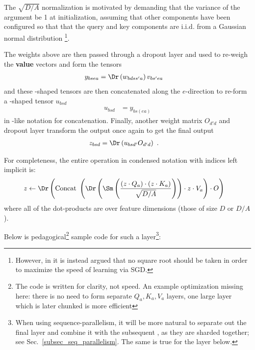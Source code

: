 The $ \sqrt{D/A} $ normalization is motivated by demanding
that the variance of the  argument be 1 at initialization, assuming that other
components have been configured so that that the query and key components are i.i.d. from a Gaussian
normal distribution \footnote{However, in \cite{yang2022tensor} it is instead argued that no square
	root should be taken in order to maximize the speed of learning via SGD.}.

The weights above are then passed through a dropout layer and used to re-weigh the \textbf{value} vectors and form the tensors
\begin{align}
	y _{ bse a} & =\Dr  \left (w _{ bdss' a} \right ) v _{ bs'ea }
	\label{eq_reweighted_values}
\end{align}
and these -shaped tensors
are then concatenated along the $ e $-direction to re-form a -shaped
tensor $ u _{ bsd } $
\begin{align}
    u _{ bsd } & = y _{ bs(e a) }
\end{align}
in \href{https://einops.rocks/1-einops-basics/}{}-like notation for concatenation.
Finally, another weight matrix $ O _{d' d } $ and dropout layer transform the output once again to get the final
output
\begin{align}
	z _{ bsd } & = \Dr \left (u  _{ bsd' } O _{ d'd }\right )\ .
\end{align}

For completeness, the entire operation in condensed notation with indices left implicit is:
\begin{align}
	z & \leftarrow \Dr \left ({\rm Concat} \ \left ( \Dr \left (\Sm  \left ( \frac{ \left ( z \cdot Q _{ a } \right )\cdot \left ( z \cdot K _{ a } \right )}{ \sqrt{D/A} }
		\right)\right )\cdot z \cdot V _{ a } \right ) \cdot O \right ) \label{eq_causal_attn}
\end{align}
where all of the dot-products are over feature dimensions (those of size $ D $ or $ D/A $).

Below is pedagogical\footnote{The
code is written for clarity, not speed. An example optimization missing here: there is no need to
form separate $ Q _{ a },K _{ a },V _{ a} $  layers, one large layer which is later
chunked is more efficient} sample code for such a   layer\footnote{When
	using sequence-parallelism, it will be more natural to separate out the final  layer
	and combine it with the subsequent , as they are sharded together; see
	Sec.~\ref{subsec_seq_parallelism}. The same is true for the  layer below.}:

